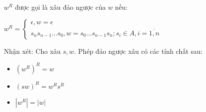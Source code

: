 \documentclass[14pt]{extreport}
\begin{document}
\begin{itemize}
\begin{enumerate}
$w^R$ được gọi là xâu đảo ngược của $w$ nếu:

$w^{R}=\left\{\begin{matrix}
\epsilon, w=\epsilon \\ 
s_ns_{n-1}...s_0, w=s_0...s_{n-1}s_n; s_i \in A,i=\overline{1,n}
\end{matrix}\right.$

Nhận xét: Cho xâu $s,w$. Phép đảo ngược xâu có các tính chất sau:
\begin{itemize}
\item ${\left(w^R\right)}^R=w$
\item ${\left(sw\right)}^R=w^Rs^R$
\item $\left|w^R\right|=\left|w\right|$
\end{itemize}
\end{enumerate}

\end{itemize}
\end{document}
